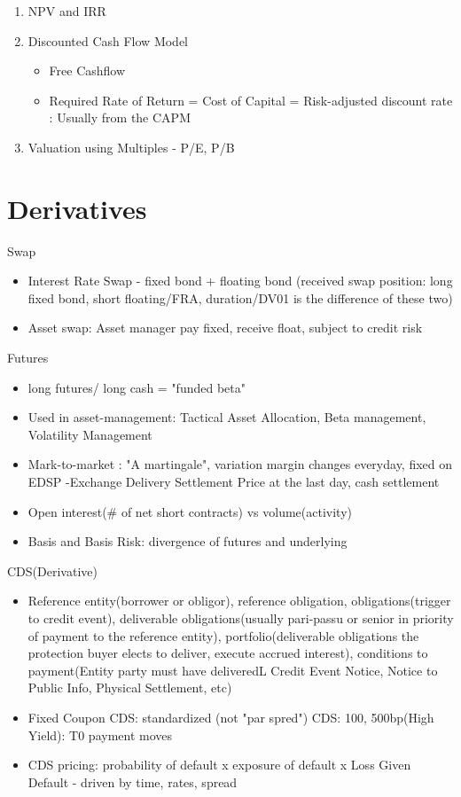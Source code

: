 \documentclass[11pt, openany]{book}              %
\begin{document}
\begin{enumerate}
 \item NPV and IRR 
 \item Discounted Cash Flow Model
  \begin{itemize}
    \item Free Cashflow
    \item Required Rate of Return = Cost of Capital = Risk-adjusted discount rate : Usually from the CAPM
   \end{itemize}
 \item Valuation using Multiples - P/E, P/B 
 \end{enumerate}

\section{Derivatives}

Swap
\begin{itemize}
    \item Interest Rate Swap - fixed bond + floating bond (received swap position: long fixed bond, short floating/FRA, duration/DV01 is the difference of these two)
    \item Asset swap: Asset manager pay fixed, receive float, subject to credit risk
 \end{itemize}

Futures
\begin{itemize}
    \item long futures/ long cash = "funded beta"
     \item Used in asset-management: Tactical Asset Allocation, Beta management, Volatility Management
     \item Mark-to-market : "A martingale", variation margin changes everyday, fixed on EDSP -Exchange Delivery Settlement Price at the last day, cash settlement
     \item Open interest(\# of net short contracts) vs volume(activity)
     \item Basis and Basis Risk: divergence of futures and underlying
\end{itemize}

CDS(Derivative)
 \begin{itemize}
    \item Reference entity(borrower or obligor), reference obligation, obligations(trigger to credit event), deliverable obligations(usually pari-passu or senior in priority of payment to the reference entity), portfolio(deliverable obligations the protection buyer elects to deliver, execute accrued interest), conditions to payment(Entity party must have deliveredL Credit Event Notice, Notice to Public Info, Physical Settlement, etc)
    \item Fixed Coupon CDS: standardized (not "par spred") CDS: 100, 500bp(High Yield): T0 payment moves
    \item CDS pricing: probability of default x exposure of default x Loss Given Default  - driven by time, rates, spread
 \end{itemize}
\end{document}
